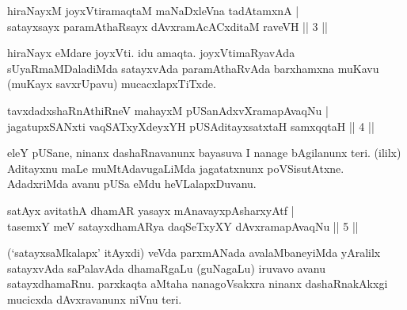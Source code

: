 \begin{shl}
hiraNayxM joyxVtiramaqtaM maNaDxleVna tadAtamxnA | \\
satayxsayx paramAthaRsayx dAvxramAcACxditaM raveVH \hfill||  3 || 
\end{shl}

\begin{artha} 
hiraNayx eMdare joyxVti. idu amaqta. joyxVtimaRyavAda 
sUyaRmaMDaladiMda satayxvAda paramAthaRvAda barxhamxna muKavu (muKayx 
savxrUpavu) mucacxlapxTiTxde.
\end{artha}


\begin{shl}
tavxdadxshaRnAthiRneV mahayxM pUSanAdxvXramapAvaqNu | \\
jagatupxSANxti vaqSATxyXdeyxYH pUSA\s \s ditayxsatxtaH samxqqtaH \hfill||  4 || 
\end{shl}

\begin{artha} 
eleY pUSane, ninanx dashaRnavanunx bayasuva I nanage bAgilanunx teri. 
(ililx) Aditayxnu maLe muMtAdavugaLiMda jagatatxnunx poVSisutAtxne. 
AdadxriMda avanu pUSa eMdu heVLalapxDuvanu.
\end{artha}


\begin{shl}
\footnotemark[1]{}satAyx avitathA dhamAR yasayx mAnavayxpAsharxyAtf | \\
tasemxY meV satayxdhamARya daqSeTxyXY dAvxramapAvaqNu \hfill||  5 || 
\end{shl}

\begin{artha} 
(`satayxsaMkalapx' itAyxdi) veVda parxmANada avalaMbaneyiMda yAralilx 
satayxvAda saPalavAda dhamaRgaLu (guNagaLu) iruvavo avanu 
satayxdhamaRnu. parxkaqta aMtaha nanagoVsakxra ninanx dashaRnakAkxgi 
mucicxda dAvxravanunx niVnu teri.
\end{artha}


